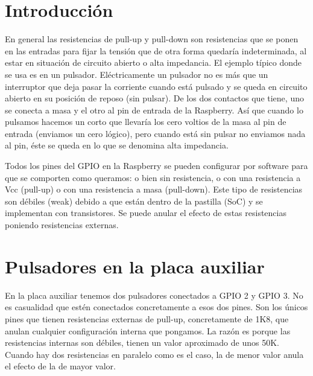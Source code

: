 
\pagestyle{fancy}
\fancyhead[LE,RO]{\thepage}
\fancyhead[LO]{\nouppercase{\rightmark}}

\label{chp:resistencias}
\minitoc

\section{Introducción}

En general las resistencias de pull-up y pull-down son resistencias que se ponen en
las entradas para fijar la tensión que de otra forma quedaría indeterminada, al estar
en situación de circuito abierto o alta impedancia. El ejemplo típico donde se usa es
en un pulsador. Eléctricamente un pulsador no es más que un interruptor que deja pasar
la corriente cuando está pulsado y se queda en circuito abierto en su posición de reposo
(sin pulsar). De los dos contactos que tiene, uno se conecta a masa y el otro al pin de
entrada de la Raspberry. Así que cuando lo pulsamos hacemos un corto que llevaría los cero
voltios de la masa al pin de entrada (enviamos un cero lógico), pero cuando está sin pulsar
no enviamos nada al pin, éste se queda en lo que se denomina alta impedancia.

Todos los pines del GPIO en la Raspberry se pueden configurar por software para que
se comporten como queramos: o bien sin resistencia, o con una resistencia a Vcc (pull-up) o
con una resistencia a masa (pull-down). Este tipo de resistencias son débiles (weak) debido
a que están dentro de la pastilla (SoC) y se implementan con transistores. Se puede
anular el efecto de estas resistencias poniendo resistencias externas.

\section{Pulsadores en la placa auxiliar}

En la placa auxiliar tenemos dos pulsadores conectados a GPIO 2 y GPIO 3. No es casualidad
que estén conectados concretamente a esos dos pines. Son los únicos pines que tienen
resistencias externas de pull-up, concretamente de 1K8, que anulan cualquier configuración
interna que pongamos. La razón es porque las resistencias internas son débiles, tienen un
valor aproximado de unos 50K. Cuando hay dos resistencias en paralelo como es el caso,
la de menor valor anula el efecto de la de mayor valor.

